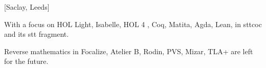 [Saclay, Leeds]

With a focus on HOL Light, Isabelle, HOL 4 , Coq,
Matita, Agda, Lean, in sttcoc and its stt fragment.

Reverse mathematics in Focalize, Atelier B, Rodin, PVS, Mizar, TLA+
are left for the future.

